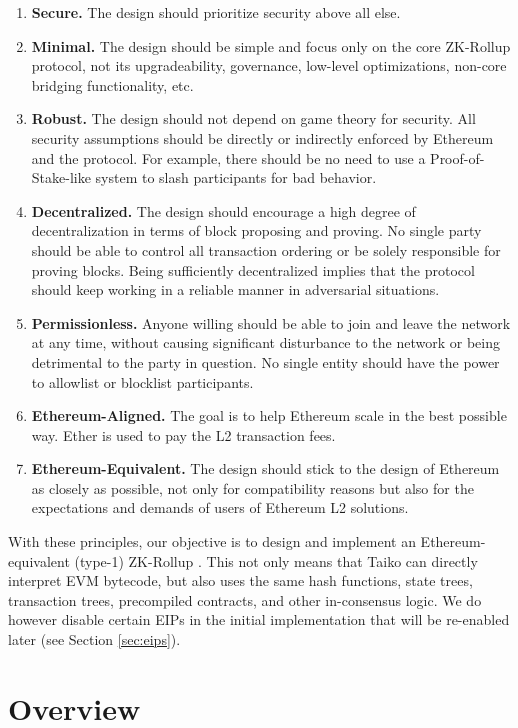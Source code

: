 \documentclass[9pt,oneside]{amsart}
\begin{document}
\begin{multicols}{2}
\begin{enumerate}
\item \textbf{Secure.} The design should prioritize security above all else.
\item \textbf{Minimal.} The design should be simple and focus only on the core ZK-Rollup protocol, not its upgradeability, governance, low-level optimizations, non-core bridging functionality, etc.
\item  \textbf{Robust.} The design should not depend on game theory for security. All security assumptions should be directly or indirectly enforced by Ethereum and the protocol. For example, there should be no need to use a Proof-of-Stake-like system to slash participants for bad behavior.
\item \textbf{Decentralized.} The design should encourage a high degree of decentralization in terms of block proposing and proving. No single party should be able to control all transaction ordering or be solely responsible for proving blocks. Being sufficiently decentralized implies that the protocol should keep working in a reliable manner in adversarial situations.
\item \textbf{Permissionless.} Anyone willing should be able to join and leave the network at any time, without causing significant disturbance to the network or being detrimental to the party in question. No single entity should have the power to allowlist or blocklist participants.
\item \textbf{Ethereum-Aligned.} The goal is to help Ethereum scale in the best possible way. Ether is used to pay the L2 transaction fees.
\item \textbf{Ethereum-Equivalent.} The design should stick to the design of Ethereum as closely as possible, not only for compatibility reasons but also for the expectations and demands of users of Ethereum L2 solutions.
\end{enumerate}

With these principles, our objective is to design and implement an Ethereum-equivalent (type-1) ZK-Rollup \cite{vitalik-zkevm}. This not only means that Taiko can directly interpret EVM bytecode, but also uses the same hash functions, state trees, transaction trees, precompiled contracts, and other in-consensus logic. We do however disable certain EIPs in the initial implementation\cite{taikoprotogithub} that will be re-enabled later (see Section \ref{sec:eips}).

\section{Overview}\label{sec:properties}


\end{multicols}
\end{document}
